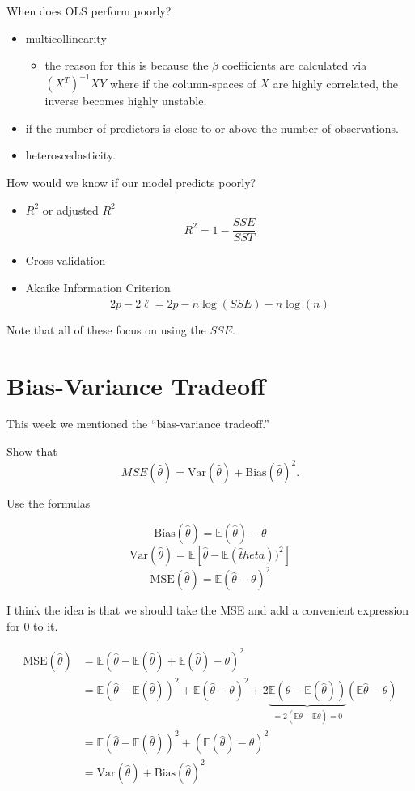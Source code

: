 \documentclass[
  letterpaper,
  DIV=11,
  numbers=noendperiod]{scrreport}
\providecommand{\tightlist}{%
  \setlength{\itemsep}{0pt}\setlength{\parskip}{0pt}}\usepackage{longtable,booktabs,array}
\begin{document}
When does OLS perform poorly?

\begin{itemize}
\tightlist
\item
  multicollinearity

  \begin{itemize}
  \tightlist
  \item
    the reason for this is because the \(\beta\) coefficients are
    calculated via \((X^T)^{-1} XY\) where if the column-spaces of \(X\)
    are highly correlated, the inverse becomes highly unstable.
  \end{itemize}
\item
  if the number of predictors is close to or above the number of
  observations.
\item
  heteroscedasticity.
\end{itemize}

How would we know if our model predicts poorly?

\begin{itemize}
\tightlist
\item
  \(R^2\) or adjusted \(R^2\) \[R^2 = 1 - \frac{SSE}{SST}\]
\item
  Cross-validation
\item
  Akaike Information Criterion
  \[2p-2 \hat \ell = 2p - n \log (SSE) - n\log (n)\]
\end{itemize}

Note that all of these focus on using the \(SSE\).

\hypertarget{bias-variance-tradeoff-1}{%
\section{Bias-Variance Tradeoff}\label{bias-variance-tradeoff-1}}

This week we mentioned the ``bias-variance tradeoff.''

Show that
\[MSE(\hat \theta) = \text{Var}(\hat \theta) + \text{Bias}(\hat \theta)^2.\]

Use the formulas

\[\text{Bias}(\hat \theta) = \mathbb E(\hat \theta) - \theta\]
\[\text{Var}(\hat \theta) = \mathbb E\left[\hat \theta - \mathbb E(\hat theta))^2 \right]\]
\[\text{MSE}(\hat \theta) = \mathbb E(\hat \theta - \theta)^2\]

I think the idea is that we should take the MSE and add a convenient
expression for 0 to it.

\[\begin{aligned}\text{MSE}(\hat \theta) & = \mathbb E(\hat \theta - \mathbb E(\hat \theta) + \mathbb E(\hat \theta) - \theta)^2 \\ 
& = \mathbb E(\hat \theta - \mathbb E(\hat \theta))^2 + \mathbb E(\hat \theta - \theta)^2 + 
2 \underbrace{\mathbb E(\theta - \mathbb E(\hat \theta))}_{=2(\mathbb E\hat \theta - \mathbb E\hat \theta) = 0}(\mathbb E\hat \theta - \theta) \\ 
& = \mathbb E(\hat \theta - \mathbb E(\hat \theta))^2 + (\mathbb E( \hat \theta) - \theta)^2 \\ 
& = \text{Var}(\hat \theta) + \text{Bias}(\hat \theta)^2 \end{aligned}\]
\end{document}
